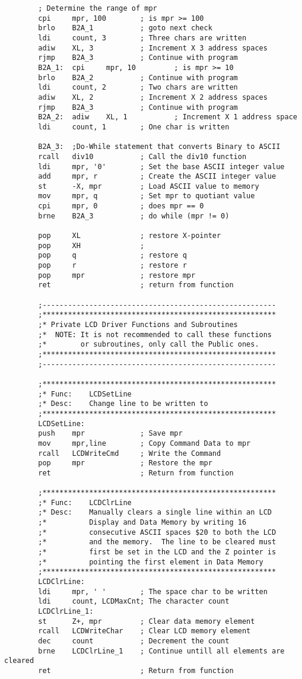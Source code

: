 \documentclass[12pt,letterpaper]{article}
\begin{document}
\begin{verbatim}
	    ; Determine the range of mpr
	    cpi		mpr, 100		; is mpr >= 100
	    brlo	B2A_1			; goto next check
	    ldi		count, 3		; Three chars are written
	    adiw	XL, 3			; Increment X 3 address spaces
	    rjmp	B2A_3			; Continue with program
	    B2A_1:	cpi		mpr, 10			; is mpr >= 10
	    brlo	B2A_2			; Continue with program
	    ldi		count, 2		; Two chars are written
	    adiw	XL, 2			; Increment X 2 address spaces
	    rjmp	B2A_3			; Continue with program
	    B2A_2:	adiw	XL, 1			; Increment X 1 address space
	    ldi		count, 1 		; One char is written
	    
	    B2A_3:	;Do-While statement that converts Binary to ASCII
	    rcall	div10			; Call the div10 function
	    ldi		mpr, '0'		; Set the base ASCII integer value
	    add		mpr, r			; Create the ASCII integer value
	    st		-X, mpr			; Load ASCII value to memory
	    mov		mpr, q			; Set mpr to quotiant value
	    cpi		mpr, 0			; does mpr == 0
	    brne	B2A_3			; do while (mpr != 0)
	    
	    pop		XL				; restore X-pointer
	    pop		XH				;
	    pop 	q				; restore q
	    pop		r				; restore r
	    pop		mpr				; restore mpr
	    ret						; return from function
	    
	    ;-------------------------------------------------------
	    ;*******************************************************
	    ;* Private LCD Driver Functions and Subroutines
	    ;*	NOTE: It is not recommended to call these functions
	    ;*	      or subroutines, only call the Public ones.
	    ;*******************************************************
	    ;-------------------------------------------------------
	    
	    ;*******************************************************
	    ;* Func:	LCDSetLine
	    ;* Desc:	Change line to be written to 
	    ;*******************************************************
	    LCDSetLine:
	    push	mpr				; Save mpr
	    mov		mpr,line		; Copy Command Data to mpr
	    rcall	LCDWriteCmd		; Write the Command
	    pop		mpr				; Restore the mpr
	    ret						; Return from function
	    
	    ;*******************************************************
	    ;* Func:	LCDClrLine
	    ;* Desc:	Manually clears a single line within an LCD
	    ;*			Display and Data Memory by writing 16 
	    ;*			consecutive ASCII spaces $20 to both the LCD 
	    ;*			and the memory.  The line to be cleared must
	    ;*			first be set in the LCD and the Z pointer is
	    ;*			pointing the first element in Data Memory
	    ;*******************************************************
	    LCDClrLine:
	    ldi		mpr, ' '		; The space char to be written
	    ldi		count, LCDMaxCnt; The character count
	    LCDClrLine_1:
	    st		Z+, mpr			; Clear data memory element
	    rcall	LCDWriteChar	; Clear LCD memory element
	    dec		count			; Decrement the count
	    brne	LCDClrLine_1	; Continue untill all elements are cleared
	    ret						; Return from function
	    

\end{verbatim}
\end{document}
